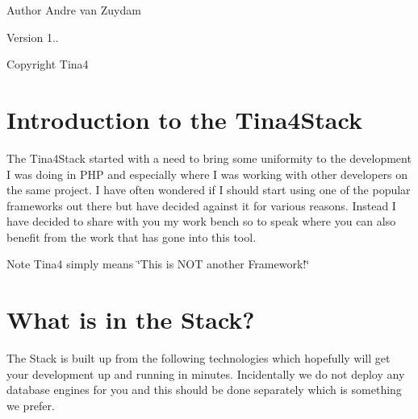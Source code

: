 \begin{DoxyAuthor}{Author}
Andre van Zuydam 
\end{DoxyAuthor}
\begin{DoxyVersion}{Version}
1.. 
\end{DoxyVersion}
\begin{DoxyCopyright}{Copyright}
Tina4
\end{DoxyCopyright}
\hypertarget{index_introduction}{}\section{Introduction to the Tina4\+Stack}\label{index_introduction}
The Tina4\+Stack started with a need to bring some uniformity to the development I was doing in P\+H\+P and especially where I was working with other developers on the same project. I have often wondered if I should start using one of the popular frameworks out there but have decided against it for various reasons. Instead I have decided to share with you my work bench so to speak where you can also benefit from the work that has gone into this tool.

\begin{DoxyNote}{Note}
Tina4 simply means \char`\"{}\+This is N\+O\+T another Framework!\char`\"{}
\end{DoxyNote}
\hypertarget{index_what_is_in_the_stack}{}\section{What is in the Stack?}\label{index_what_is_in_the_stack}
The Stack is built up from the following technologies which hopefully will get your development up and running in minutes. Incidentally we do not deploy any database engines for you and this should be done separately which is something we prefer.


